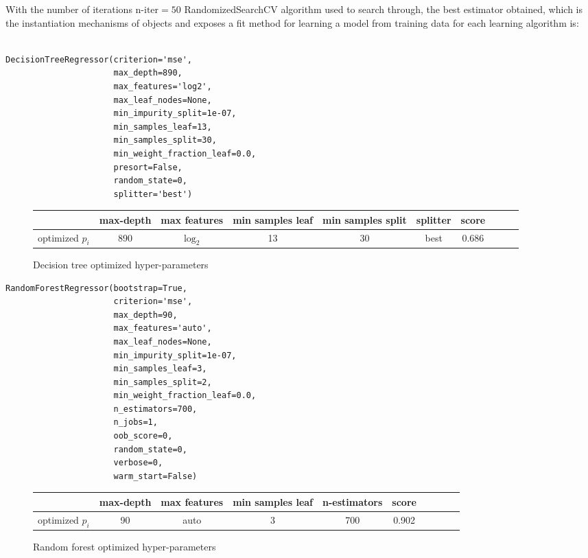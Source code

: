 With the number of iterations $\text{n-iter}=50$ RandomizedSearchCV algorithm used to search through, the best estimator obtained, which is the instantiation
mechanisms of objects and exposes a fit method for learning a model from
training data for each learning algorithm is:   
\begin{tcolorbox}
\begin{verbatim}

DecisionTreeRegressor(criterion='mse', 
                      max_depth=890,       
                      max_features='log2',
                      max_leaf_nodes=None,
                      min_impurity_split=1e-07,
                      min_samples_leaf=13, 
                      min_samples_split=30,
                      min_weight_fraction_leaf=0.0, 
                      presort=False, 
                      random_state=0,
                      splitter='best')
\end{verbatim}
\end{tcolorbox}
\begin{figure}[H]
\centering 
\begin{tabular}{l*{8}{c}r}
\hline
            & max-depth &max features&min samples leaf & min samples split  &splitter& score \\
\hline
optimized $p_i$  & 890 & $\log_2$ & 13 & 30 & best&0.686  \\
\end{tabular}
\caption{Decision tree optimized hyper-parameters }
\end{figure}
\begin{tcolorbox}
\begin{verbatim}
RandomForestRegressor(bootstrap=True,
                      criterion='mse',
                      max_depth=90,
                      max_features='auto',
                      max_leaf_nodes=None,
                      min_impurity_split=1e-07,
                      min_samples_leaf=3,
                      min_samples_split=2,
                      min_weight_fraction_leaf=0.0,
                      n_estimators=700,
                      n_jobs=1, 
                      oob_score=0,
                      random_state=0,
                      verbose=0,
                      warm_start=False)
\end{verbatim}
\end{tcolorbox}
\begin{figure}[H]
\centering 
\begin{tabular}{l*{8}{c}r}
\hline
            & max-depth &max features&min samples leaf &n-estimators & score \\
\hline
optimized $p_i$  & 90 & auto & 3 & 700 & 0.902 \\
\end{tabular}
\caption{Random forest optimized hyper-parameters }
\end{figure}
